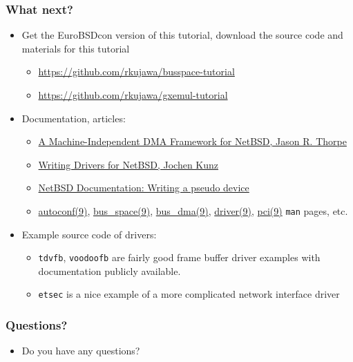 \documentclass[dvipsnames,table]{beamer}
\begin{document}
\begin{frame}
\frametitle{What next?}

\begin{itemize}
	\item Get the EuroBSDcon version of this tutorial, download the source code and materials for this tutorial
	\begin{itemize}
		\item {\small\url{https://github.com/rkujawa/busspace-tutorial}}
		\item {\small\url{https://github.com/rkujawa/gxemul-tutorial}}
	\end{itemize} 
	
	\item Documentation, articles:
	\begin{itemize}
		\item \href{http://www.netbsd.org/docs/kernel/bus_dma.pdf}{A Machine-Independent DMA Framework for NetBSD, Jason R. Thorpe}
		\item \href{ftp://ftp.netbsd.org/pub/NetBSD/misc/ddwg/NetBSD-driver_writing-1.0.1e.pdf}{Writing Drivers for NetBSD, Jochen Kunz}
		\item \href{http://www.netbsd.org/docs/kernel/pseudo/}{NetBSD Documentation: Writing a pseudo device}
		\item \href{http://netbsd.gw.com/cgi-bin/man-cgi?autoconf+9+NetBSD-current}{autoconf(9)}, 
			\href{http://netbsd.gw.com/cgi-bin/man-cgi?bus_space+9+NetBSD-current}{bus\_space(9)},
			\href{http://netbsd.gw.com/cgi-bin/man-cgi?bus_dma+9+NetBSD-current}{bus\_dma(9)},
			\href{http://netbsd.gw.com/cgi-bin/man-cgi?driver+9+NetBSD-current}{driver(9)}, 
			\href{http://netbsd.gw.com/cgi-bin/man-cgi?pci+9+NetBSD-current}{pci(9)}
			{\tt man} pages, etc.
	\end{itemize}
	\item Example source code of drivers:
	\begin{itemize}
		\item {\tt tdvfb}, {\tt voodoofb} are fairly good frame buffer driver examples with documentation publicly available.
		\item {\tt etsec} is a nice example of a more complicated network interface driver
	\end{itemize}
\end{itemize}
\end{frame}


\begin{frame}
\frametitle{Questions?}

\begin{itemize}
	\item Do you have any questions?
\end{itemize}
\end{frame}
\end{document}
